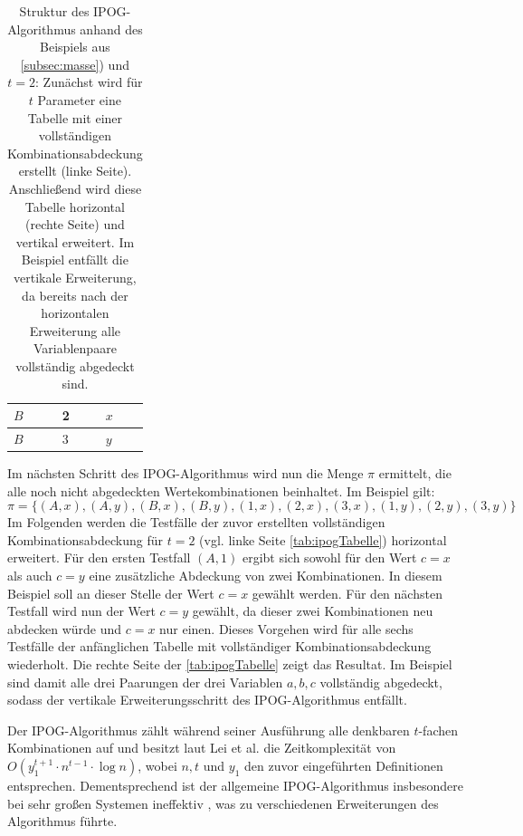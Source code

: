 \begin{table}[!htb]
\begin{minipage}{0.25\linewidth}
\begin{tabular}{|l|l|l|}
			$B$ & 2 & $x$ \\ \hline
			$B$ & 3 & $y$ \\ \hline
		\end{tabular}
    \end{minipage} 
    \caption{Struktur des IPOG-Algorithmus anhand des Beispiels aus \autoref{subsec:masse}) und $t=2$: Zunächst wird für $t$ Parameter eine Tabelle mit einer vollständigen Kombinationsabdeckung erstellt (linke Seite). Anschließend wird diese Tabelle horizontal (rechte Seite) und vertikal erweitert. Im Beispiel entfällt die vertikale Erweiterung, da bereits nach der horizontalen Erweiterung alle Variablenpaare vollständig abgedeckt sind.}
	\label{tab:ipogTabelle}
\end{table}

Im nächsten Schritt des IPOG-Algorithmus wird nun die Menge $\pi$ ermittelt, die alle noch nicht abgedeckten Wertekombinationen beinhaltet. Im Beispiel gilt: \[\pi = \{(A,x), (A,y), (B,x), (B,y), (1,x), (2,x), (3,x), (1,y), (2,y), (3,y)\}\]
Im Folgenden werden die Testfälle der zuvor erstellten vollständigen Kombinationsabdeckung für $t=2$ (vgl. linke Seite \autoref{tab:ipogTabelle}) \glqq horizontal\grqq{} erweitert. Für den ersten Testfall $(A,1)$ ergibt sich sowohl für den Wert $c=x$ als auch $c=y$ eine zusätzliche Abdeckung von zwei Kombinationen. In diesem Beispiel soll an dieser Stelle der Wert $c=x$ gewählt werden. Für den nächsten Testfall wird nun der Wert $c=y$ gewählt, da dieser zwei Kombinationen neu abdecken würde und $c=x$ nur einen. Dieses Vorgehen wird für alle sechs Testfälle der anfänglichen Tabelle mit vollständiger Kombinationsabdeckung wiederholt. Die rechte Seite der \autoref{tab:ipogTabelle} zeigt das Resultat. Im Beispiel sind damit alle drei Paarungen der drei Variablen $a,b,c$ vollständig abgedeckt, sodass der vertikale Erweiterungsschritt des IPOG-Algorithmus entfällt.


\hspace{1cm} Der IPOG-Algorithmus zählt während seiner Ausführung alle denkbaren $t$-fachen Kombinationen auf und besitzt laut Lei et al. \cite{lei2008ipog} die Zeitkomplexität von $ O(y_1^{t+1} \cdot n^{t-1} \cdot \log n)$, wobei $n, t$ und $y_1$ den zuvor eingeführten Definitionen entsprechen. Dementsprechend ist der allgemeine IPOG-Algorithmus insbesondere bei sehr großen Systemen ineffektiv \cite{lei2008ipog}, was zu verschiedenen Erweiterungen des Algorithmus führte. 

